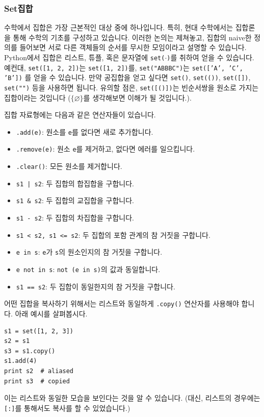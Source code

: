 \documentclass[../main.tex]{subfiles}
\begin{document}
\subsubsection{Set집합}
수학에서 집합은 가장 근본적인 대상 중에 하나입니다.
특히, 현대 수학에서는 집합론을 통해 수학의 기초를 구성하고 있습니다.
이러한 논의는 제쳐놓고, 집합의 naive한 정의를 들어보면 서로 다른 객체들의 순서를 무시한 모임이라고 설명할 수 있습니다.
Python에서 집합은 리스트, 튜플, 혹은 문자열에 \texttt{set($\cdot$)}를 취하여 얻을 수 있습니다.
예컨대, \texttt{set([1, 2, 2])}는 \texttt{set([1, 2])}를, \texttt{set("ABBBC")}는 \texttt{set(['A', 'C', 'B'])} 를 얻을 수 있습니다.
만약 공집합을 얻고 싶다면 \texttt{set()}, \texttt{set(())}, \texttt{set([])}, \texttt{set("")} 등을 사용하면 됩니다.
유의할 점은, \texttt{set([()])}는 빈순서쌍을 원소로 가지는 집합이라는 것입니다 ($\{\varnothing\}$를 생각해보면 이해가 될 것입니다.).

집합 자료형에는 다음과 같은 연산자들이 있습니다.
\begin{itemize}
    \item \texttt{.add(e)}: 원소를 \texttt{e}를 없다면 새로 추가합니다.
    \item \texttt{.remove(e)}: 원소 \texttt{e}를 제거하고, 없다면 에러를 일으킵니다.
    \item \texttt{.clear()}: 모든 원소를 제거합니다.
    \item \texttt{s1 | s2}: 두 집합의 합집합을 구합니다.
    \item \texttt{s1 \& s2}: 두 집합의 교집합을 구합니다.
    \item \texttt{s1 - s2}: 두 집합의 차집합을 구합니다.
    \item \texttt{s1 < s2, s1 <= s2}: 두 집합의 포함 관계의 참 거짓을 구합니다.
    \item \texttt{e in s}: \texttt{e}가 \texttt{s}의 원소인지의 참 거짓을 구합니다.
    \item \texttt{e not in s}: \texttt{not (e in s)}의 값과 동일합니다.
    \item \texttt{s1 == s2}: 두 집합이 동일한지의 참 거짓을 구합니다.
\end{itemize}

어떤 집합을 복사하기 위해서는 리스트와 동일하게 \texttt{.copy()} 연산자를 사용해야 합니다.
아래 예시를 살펴봅시다.
\begin{verbatim}
s1 = set([1, 2, 3])
s2 = s1
s3 = s1.copy()
s1.add(4)
print s2  # aliased
print s3  # copied
\end{verbatim}
이는 리스트와 동일한 모습을 보인다는 것을 알 수 있습니다.
(대신, 리스트의 경우에는 \texttt{[:]}를 통해서도 복사를 할 수 있었습니다.)
\end{document}
